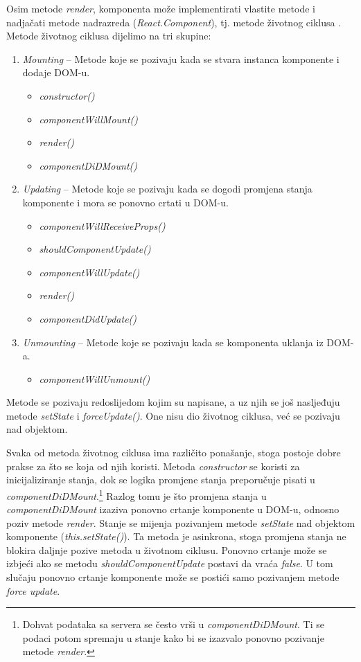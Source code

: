 \documentclass[times, utf8, zavrsni, numeric]{fer}
\newcommand{\razmaks}{\vspace{10pt}}
\begin{document}
Osim metode \emph{render}, komponenta može implementirati vlastite metode i nadjačati metode nadrazreda (\emph{React.Component}), tj. metode životnog ciklusa .
Metode životnog ciklusa dijelimo na tri skupine:
\begin{enumerate}
  \item \emph{Mounting} -- Metode koje se pozivaju kada se stvara instanca komponente i dodaje DOM-u.
  \begin{itemize}
    \item \emph{constructor()}
    \item \emph{componentWillMount()}
    \item \emph{render()}
    \item \emph{componentDiDMount()}
  \end{itemize}
  \item \emph{Updating} -- Metode koje se pozivaju kada se dogodi promjena stanja komponente i mora se ponovno crtati u DOM-u.
  \begin{itemize}
    \item \emph{componentWillReceiveProps()}
    \item \emph{shouldComponentUpdate()}
    \item \emph{componentWillUpdate()}
    \item \emph{render()}
    \item \emph{componentDidUpdate()}
  \end{itemize}
  \item \emph{Unmounting} -- Metode koje se pozivaju kada se komponenta uklanja iz DOM-a.
  \begin{itemize}
    \item \emph{componentWillUnmount()}
  \end{itemize}
\end{enumerate}
\razmaks

Metode se pozivaju redoslijedom kojim su napisane, a uz njih se još nasljeđuju metode \emph{setState}
i \emph{forceUpdate()}.
One nisu dio životnog ciklusa, već se pozivaju nad objektom.

Svaka od metoda životnog ciklusa ima različito ponašanje, stoga postoje dobre prakse za što se koja od njih koristi.
Metoda \emph{constructor} se koristi za inicijaliziranje stanja, dok se logika promjene stanja preporučuje pisati u \emph{componentDiDMount}.\footnote{Dohvat podataka sa servera se često vrši u \emph{componentDiDMount}. Ti se podaci potom spremaju u stanje kako bi se izazvalo ponovno pozivanje metode \emph{render}.}
Razlog tomu je što promjena stanja u \emph{componentDiDMount} izaziva ponovno crtanje komponente u DOM-u, odnosno poziv metode \emph{render}.
Stanje se mijenja pozivanjem metode \emph{setState} nad objektom komponente (\glqq \emph{this.setState()}\grqq ).
Ta metoda je asinkrona, stoga promjena stanja ne blokira daljnje pozive metoda u životnom ciklusu.
Ponovno crtanje može se izbjeći ako se metodu \emph{shouldComponentUpdate} postavi da vraća \emph{false}.
U tom slučaju ponovno crtanje komponente može se postići samo pozivanjem metode \emph{force update}.
\end{document}
